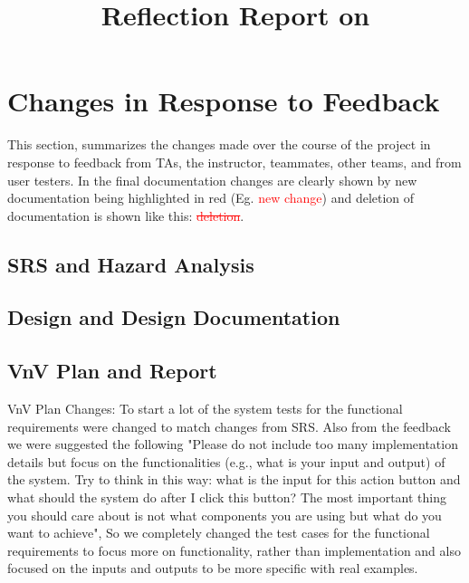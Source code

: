 \documentclass{article}
\title{Reflection Report on \progname}
\author{\authname}
\date{}
\begin{document}
\maketitle


\section{Changes in Response to Feedback}

This section, summarizes the changes made over the course of the project in response to feedback from TAs, the instructor, teammates, other teams, and from user testers. In the final documentation changes are clearly shown by new documentation being highlighted in red (Eg. \textcolor{red}{new change}) and deletion of documentation is shown like this: \textcolor{red}{\sout{deletion}}.

\subsection{SRS and Hazard Analysis}

\subsection{Design and Design Documentation}

\subsection{VnV Plan and Report}

VnV Plan Changes: To start a lot of the system tests for the functional requirements were changed to match changes from SRS. Also from the feedback we were suggested the following "Please do not include too many implementation details but focus on the functionalities (e.g., what is your input and output) of the system. Try to think in this way: what is the input for this action button and what should the system do after I click this button? The most important thing you should care about is not what components you are using but what do you want to achieve", So we completely changed the test cases for the functional requirements to focus more on functionality, rather than implementation and also focused on the inputs and outputs to be more specific with real examples. \\
\end{document}
